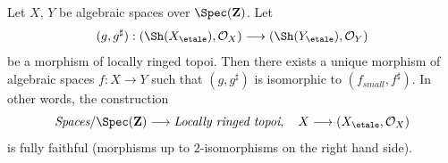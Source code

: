 %
\begin{theorem}
\label{theorem-fully-faithful}
Let $X$, $Y$ be algebraic spaces over $\Spec(\mathbf{Z})$.
Let
$$
(g, g^\sharp) :
(\Sh(X_\etale), \mathcal{O}_X)
\longrightarrow
(\Sh(Y_\etale), \mathcal{O}_Y)
$$
be a morphism of locally ringed topoi. Then there exists a
unique morphism of algebraic spaces $f : X \to Y$ such that
$(g, g^\sharp)$ is isomorphic to $(f_{small}, f^\sharp)$.
In other words, the construction
$$
\textit{Spaces}/\Spec(\mathbf{Z})
\longrightarrow \textit{Locally ringed topoi},
\quad
X \longrightarrow (X_\etale, \mathcal{O}_X)
$$
is fully faithful (morphisms up to $2$-isomorphisms on the right hand side).
\end{theorem}

